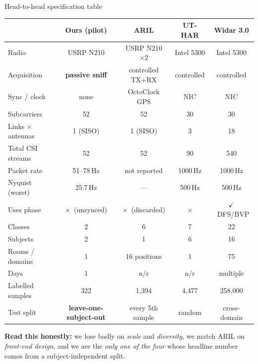 \documentclass[aspectratio=169,10pt]{beamer}
\newcommand{\yes}{\textcolor{good}{$\checkmark$}}
\newcommand{\no}{\textcolor{bad}{$\times$}}
\newcommand{\gd}[1]{\textcolor{good}{#1}}
\newcommand{\wn}[1]{\textcolor{warn}{#1}}
\newcommand{\bd}[1]{\textcolor{bad}{#1}}
\begin{document}
\begin{frame}{Head-to-head specification table}
\centering
\begin{table}\scriptsize
\begin{tabular}{@{}l|c|ccc@{}}
\toprule
 & \cellcolor{red!12}\textbf{Ours (pilot)} & \textbf{ARIL} & \textbf{UT-HAR} & \textbf{Widar 3.0}\\
\midrule
Radio & \cellcolor{red!6}USRP N210 & USRP N210 $\times2$ & Intel 5300 & Intel 5300\\
Acquisition & \cellcolor{red!6}\textbf{passive sniff} & controlled TX+RX & controlled & controlled\\
Sync / clock & \cellcolor{red!6}none & OctoClock GPS & NIC & NIC\\
\midrule
Subcarriers & \cellcolor{red!6}52 & 52 & 30 & 30\\
Links $\times$ antennas & \cellcolor{red!6}\bd{1 (SISO)} & 1 (SISO) & 3 & \gd{18}\\
Total CSI streams & \cellcolor{red!6}\bd{52} & 52 & 90 & \gd{540}\\
\midrule
Packet rate & \cellcolor{red!6}\wn{51--78\,Hz} & not reported & \gd{1000\,Hz} & \gd{1000\,Hz}\\
Nyquist (worst) & \cellcolor{red!6}\wn{25.7\,Hz} & --- & 500\,Hz & 500\,Hz\\
\midrule
Uses phase & \cellcolor{red!6}\no\ (unsynced) & \no\ (discarded) & \no & \yes\ DFS/BVP\\
Classes & \cellcolor{red!6}\bd{2} & 6 & 7 & \gd{22}\\
Subjects & \cellcolor{red!6}\bd{2} & \bd{1} & 6 & \gd{16}\\
Rooms / domains & \cellcolor{red!6}\bd{1} & 16 positions & 1 & \gd{75}\\
Days & \cellcolor{red!6}\bd{1} & n/r & n/r & multiple\\
Labelled samples & \cellcolor{red!6}\bd{322} & 1{,}394 & 4{,}477 & \gd{258{,}000}\\
\midrule
Test split & \cellcolor{red!6}\gd{\textbf{leave-one-subject-out}} & \bd{every 5th sample} & \bd{random} & \gd{cross-domain}\\
\bottomrule
\end{tabular}
\end{table}

\vspace{0.2em}
\scriptsize
\textbf{Read this honestly:} we lose badly on \emph{scale} and \emph{diversity}, we match ARIL on
\emph{front-end design}, and we are the \emph{only one of the four} whose headline number comes from a
subject-independent split.
\end{frame}
\end{document}

